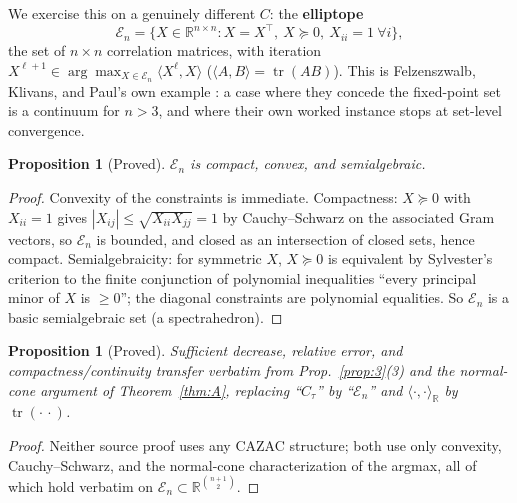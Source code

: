 \documentclass[11pt]{article}
\theoremstyle{plain}
\newtheorem{proposition}[theorem]{Proposition}
\theoremstyle{definition}
\theoremstyle{remark}
\newcommand{\R}{\mathbb R}
\newcommand{\El}{\mathcal E_n}
\begin{document}
We exercise this on a genuinely different $C$: the \textbf{elliptope}
$$\El=\{X\in\R^{n\times n}: X=X^\top,\ X\succeq0,\ X_{ii}=1\ \forall i\},$$
the set of $n\times n$ correlation matrices, with iteration
$X^{\ell+1}\in\arg\max_{X\in\El}\langle X^\ell,X\rangle$
($\langle A,B\rangle=\operatorname{tr}(AB)$). This is Felzenszwalb, Klivans,
and Paul's own example \cite{FKP21}: a case where they concede the
fixed-point set is a continuum for $n>3$, and where their own worked
instance stops at set-level convergence.

\begin{proposition}[Proved]\label{prop:ell1}
$\El$ is compact, convex, and semialgebraic.
\end{proposition}
\begin{proof}
Convexity of the constraints is immediate. Compactness: $X\succeq0$ with
$X_{ii}=1$ gives $|X_{ij}|\le\sqrt{X_{ii}X_{jj}}=1$ by Cauchy--Schwarz on
the associated Gram vectors, so $\El$ is bounded, and closed as an
intersection of closed sets, hence compact. Semialgebraicity: for
symmetric $X$, $X\succeq0$ is equivalent by Sylvester's criterion to the
finite conjunction of polynomial inequalities ``every principal minor of
$X$ is $\ge0$''; the diagonal constraints are polynomial equalities. So
$\El$ is a basic semialgebraic set (a spectrahedron).
\end{proof}

\begin{proposition}[Proved]\label{prop:ell2}
Sufficient decrease, relative error, and compactness/continuity transfer
verbatim from Prop.~\ref{prop:3}(3) and the normal-cone argument of
Theorem~\ref{thm:A}, replacing ``$C_\tau$'' by ``$\El$'' and
$\langle\cdot,\cdot\rangle_\R$ by $\operatorname{tr}(\cdot\,\cdot)$.
\end{proposition}
\begin{proof}
Neither source proof uses any CAZAC structure; both use only convexity,
Cauchy--Schwarz, and the normal-cone characterization of the argmax, all of
which hold verbatim on $\El\subset\R^{\binom{n+1}2}$.
\end{proof}
\end{document}

